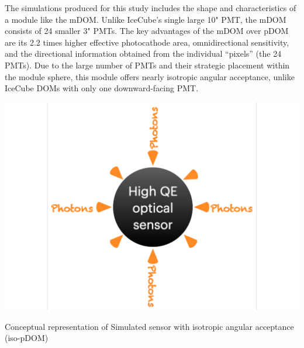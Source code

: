 The simulations produced for this study includes the shape and characteristics of a module like the mDOM. Unlike IceCube’s single large 10" PMT, the mDOM consists of 24 smaller 3" PMTs. The key advantages of the mDOM over pDOM are its 2.2 times higher effective photocathode area, omnidirectional sensitivity, and the directional information obtained from the individual “pixels” (the 24 PMTs). Due to the large number of PMTs and their strategic placement within the module sphere, this module offers nearly isotropic angular acceptance, unlike IceCube DOMs with only one downward-facing PMT. 
\begin{marginfigure}
    \includegraphics{./figures/gen2/iso-pDOM.pdf}
    \caption{Conceptual representation of Simulated sensor with isotropic angular acceptance (iso-pDOM)}
\end{marginfigure}


